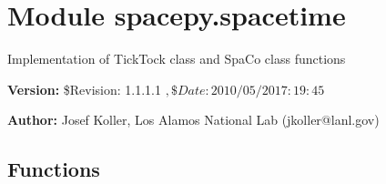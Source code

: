 %
%
%


\section{Module spacepy.spacetime}

    \label{spacepy:spacetime}
Implementation of TickTock class and SpaCo class functions

\textbf{Version:} \$Revision: 1.1.1.1 $, \$Date: 2010/05/20 17:19:45 $



\textbf{Author:} Josef Koller, Los Alamos National Lab (jkoller@lanl.gov)





  \subsection{Functions}

    \label{spacepy:spacetime:doy2date}

    \vspace{0.5ex}

